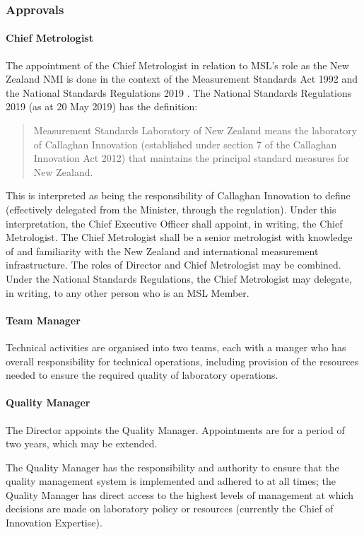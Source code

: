 \subsubsection{Approvals}
\paragraph{Chief Metrologist}    

The appointment of the Chief Metrologist in relation to MSL's role as the New Zealand NMI is done in the context of the Measurement Standards Act 1992 \cite{MS_ACT_1992} and the National Standards Regulations 2019 \cite{NS_Regulations}.
The National Standards Regulations 2019 (as at 20 May 2019) has the definition:
\begin{quote}
Measurement Standards Laboratory of New Zealand means the laboratory of Callaghan 
Innovation (established under section 7 of the Callaghan Innovation Act 2012) that maintains 
the principal standard measures for New Zealand.
\end{quote}
This is interpreted as being the responsibility of Callaghan Innovation to define (effectively delegated from the Minister, through the regulation). Under this interpretation, the Chief Executive Officer shall appoint, in writing, the Chief Metrologist. The Chief Metrologist shall be a senior metrologist with knowledge of and familiarity with the New Zealand and international measurement infrastructure. The roles of Director and Chief Metrologist may be combined.
Under the National Standards Regulations, the Chief Metrologist may delegate, in writing, to any other person who is an MSL Member.
\paragraph{Team Manager}
Technical activities are organised into two teams, each with a manger who has overall responsibility for technical operations, including provision of the resources needed to ensure the required quality of laboratory operations. 
\paragraph{Quality Manager}
The Director appoints the Quality Manager. Appointments are for a period of two years, which may be extended. 

The Quality Manager has the responsibility and authority to ensure that the quality management system is implemented and adhered to at all times; the Quality Manager has direct access to the highest levels of management at which decisions are made on laboratory policy or resources (currently the Chief of Innovation Expertise).

